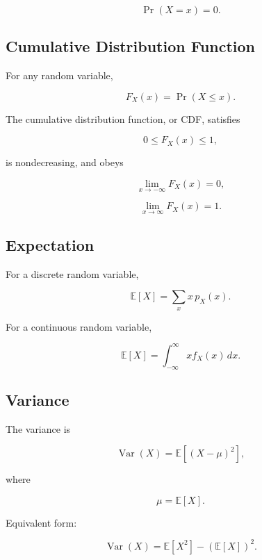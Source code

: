 \[
\boxed{
\Pr(X=x)=0.
}
\]

\subsection{Cumulative Distribution Function}
\label{subsec:cdf-reference}

For any random variable,

\[
\boxed{
F_X(x)
=
\Pr(X\leq x).
}
\]

The cumulative distribution function, or CDF, satisfies

\[
\boxed{
0\leq F_X(x)\leq1,
}
\]

is nondecreasing, and obeys

\[
\boxed{
\lim_{x\to-\infty}F_X(x)=0,
}
\]

\[
\boxed{
\lim_{x\to\infty}F_X(x)=1.
}
\]

\subsection{Expectation}
\label{subsec:expectation-distribution-reference}

For a discrete random variable,

\[
\boxed{
\mathbb{E}[X]
=
\sum_x
x\,p_X(x).
}
\]

For a continuous random variable,

\[
\boxed{
\mathbb{E}[X]
=
\int_{-\infty}^{\infty}
x f_X(x)\,dx.
}
\]

\subsection{Variance}
\label{subsec:variance-distribution-reference}

The variance is

\[
\boxed{
\operatorname{Var}(X)
=
\mathbb{E}
\left[
(X-\mu)^2
\right],
}
\]

where

\[
\mu=\mathbb{E}[X].
\]

Equivalent form:

\[
\boxed{
\operatorname{Var}(X)
=
\mathbb{E}[X^2]
-
(\mathbb{E}[X])^2.
}
\]

